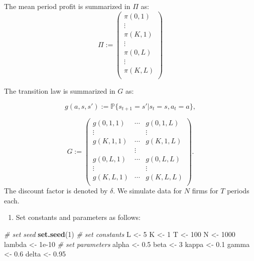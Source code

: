 \documentclass[]{book}
\newenvironment{Shaded}{\begin{snugshade}}{\end{snugshade}}
\newcommand{\KeywordTok}[1]{\textcolor[rgb]{0.13,0.29,0.53}{\textbf{#1}}}
\newcommand{\DecValTok}[1]{\textcolor[rgb]{0.00,0.00,0.81}{#1}}
\newcommand{\FloatTok}[1]{\textcolor[rgb]{0.00,0.00,0.81}{#1}}
\newcommand{\StringTok}[1]{\textcolor[rgb]{0.31,0.60,0.02}{#1}}
\newcommand{\CommentTok}[1]{\textcolor[rgb]{0.56,0.35,0.01}{\textit{#1}}}
\newcommand{\NormalTok}[1]{#1}
\providecommand{\tightlist}{%
  \setlength{\itemsep}{0pt}\setlength{\parskip}{0pt}}
\begin{document}
The mean period profit is summarized in \(\Pi\) as: \[
\Pi :=
\begin{pmatrix}
\pi(0, 1)\\
\vdots\\
\pi(K, 1)\\
\vdots \\
\pi(0, L)\\
\vdots\\
\pi(K, L)\\
\end{pmatrix}
\]

The transition law is summarized in \(G\) as:

\[
g(a, s, s') := \mathbb{P}\{s_{t + 1} = s'|s_t = s, a_t = a\},
\]

\[
G := 
\begin{pmatrix}
g(0, 1, 1) & \cdots & g(0, 1, L)\\
\vdots & & \vdots \\
g(K, 1, 1) & \cdots & g(K, 1, L)\\
& \vdots & \\
g(0, L, 1) & \cdots & g(0, L, L)\\
\vdots & & \vdots \\
g(K, L, 1) & \cdots & g(K, L, L)\\
\end{pmatrix}.
\] The discount factor is denoted by \(\delta\). We simulate data for
\(N\) firms for \(T\) periods each.

\begin{enumerate}
\def\labelenumi{\arabic{enumi}.}
\tightlist
\item
  Set constants and parameters as follows:
\end{enumerate}

\begin{Shaded}
\begin{Highlighting}[]
\CommentTok{# set seed}
\KeywordTok{set.seed}\NormalTok{(}\DecValTok{1}\NormalTok{)}
\CommentTok{# set constants }
\NormalTok{L <-}\StringTok{ }\DecValTok{5}
\NormalTok{K <-}\StringTok{ }\DecValTok{1}
\NormalTok{T <-}\StringTok{ }\DecValTok{100}
\NormalTok{N <-}\StringTok{ }\DecValTok{1000}
\NormalTok{lambda <-}\StringTok{ }\FloatTok{1e-10}
\CommentTok{# set parameters}
\NormalTok{alpha <-}\StringTok{ }\FloatTok{0.5}
\NormalTok{beta <-}\StringTok{ }\DecValTok{3}
\NormalTok{kappa <-}\StringTok{ }\FloatTok{0.1}
\NormalTok{gamma <-}\StringTok{ }\FloatTok{0.6}
\NormalTok{delta <-}\StringTok{ }\FloatTok{0.95}
\end{Highlighting}
\end{Shaded}
\end{document}
